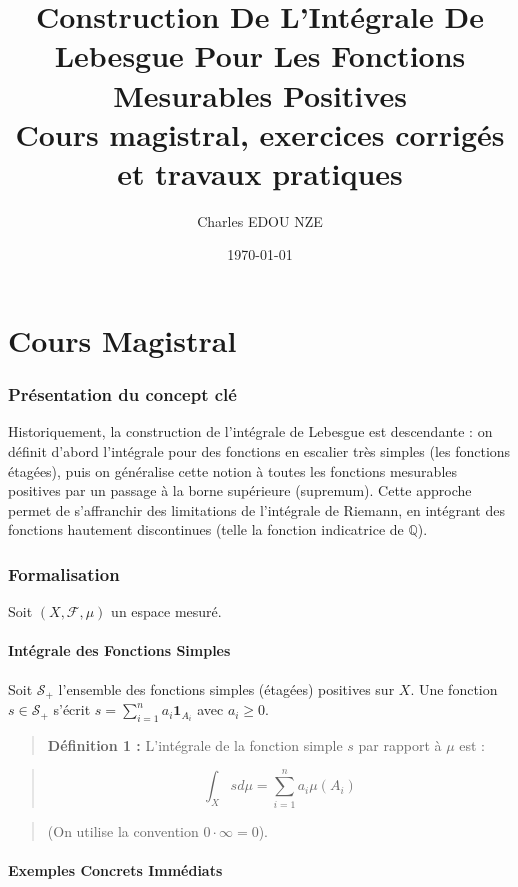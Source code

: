 \documentclass[11pt,a4paper]{article}
\title{\Huge Construction De L'Int\'egrale De Lebesgue Pour Les Fonctions Mesurables Positives \\ \large Cours magistral, exercices corrig\'es et travaux pratiques}
\author{\Large Charles EDOU NZE}
\date{\today}
\begin{document}
\maketitle
\tableofcontents
\n\newpage
\part{Cours Magistral}


\section{Pr\'esentation du concept cl\'e}

Historiquement, la construction de l'int\'egrale de Lebesgue est descendante : on d\'efinit d'abord l'int\'egrale pour des fonctions en escalier tr\`es simples (les fonctions \'etag\'ees), puis on g\'en\'eralise cette notion \`a toutes les fonctions mesurables positives par un passage \`a la borne sup\'erieure (supremum). Cette approche permet de s'affranchir des limitations de l'int\'egrale de Riemann, en int\'egrant des fonctions hautement discontinues (telle la fonction indicatrice de $\mathbb{Q}$).

\section{Formalisation}

Soit $(X, \mathcal{F}, \mu)$ un espace mesur\'e.

\subsection*{Int\'egrale des Fonctions Simples}

Soit $\mathcal{S}_+$ l'ensemble des fonctions simples (\'etag\'ees) positives sur $X$.
Une fonction $s \in \mathcal{S}_+$ s'\'ecrit $s = \sum_{i=1}^n a_i \mathbf{1}_{A_i}$ avec $a_i \ge 0$.

\begin{quote}
\textbf{D\'efinition 1 :} L'int\'egrale de la fonction simple $s$ par rapport \`a $\mu$ est :
\end{quote}
\begin{quote}
$$\int_X s d\mu = \sum_{i=1}^n a_i \mu(A_i)$$
\end{quote}
\begin{quote}
(On utilise la convention $0 \cdot \infty = 0$).
\end{quote}


\subsection*{Exemples Concrets Imm\'ediats}
\end{document}
